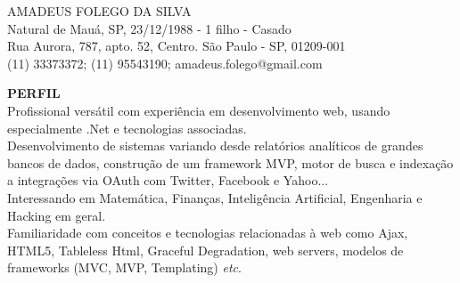\documentclass[12pt]{article}
\begin{document}
\begin{center}
 {\Large    AMADEUS FOLEGO DA SILVA}
\\[.1in]
{\scriptsize 
Natural de Mauá, SP, 23/12/1988 - 1 filho - Casado \\
Rua Aurora, 787, apto. 52, Centro. São Paulo - SP, 01209-001 \\
(11) 33373372;  (11) 95543190;  amadeus.folego@gmail.com\\}
\end{center}

\vspace{.1in}

\hspace{-.29in}
 {\bf  PERFIL }\\[.1in]
 \indent Profissional versátil com experiência em desenvolvimento web, usando especialmente .Net e tecnologias associadas. \\
 \indent Desenvolvimento de sistemas variando desde relatórios analíticos de grandes bancos de dados, construção de um framework MVP, motor de busca e indexação a integrações via OAuth com Twitter, Facebook e Yahoo...\\
 \indent Interessando em Matemática, Finanças, Inteligência Artificial, Engenharia e Hacking em geral.\\
 \indent Familiaridade com conceitos e tecnologias relacionadas à web como Ajax, HTML5, Tableless Html, Graceful Degradation, web servers, modelos de frameworks (MVC, MVP, Templating) \textit{etc}.\\
 
\end{document}

